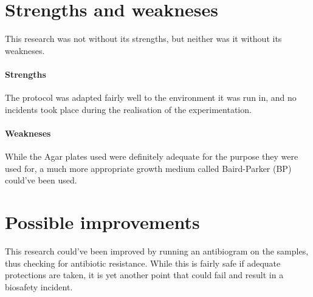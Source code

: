 \section{Strengths and weakneses}
This research was not without its strengths, but neither was it without its weakneses.
\paragraph{Strengths} The protocol was adapted fairly well to the environment it was run in, and no incidents took place during the realisation of the experimentation.
\paragraph{Weakneses} While the Agar plates used were definitely adequate for the purpose they were used for, a much more appropriate growth medium called Baird-Parker (BP) could've been used.
\section{Possible improvements}
This research could've been improved by running an antibiogram on the samples, thus checking for antibiotic resistance. While this is fairly safe if adequate protections are taken, it is yet another point that could fail and result in a biosafety incident.